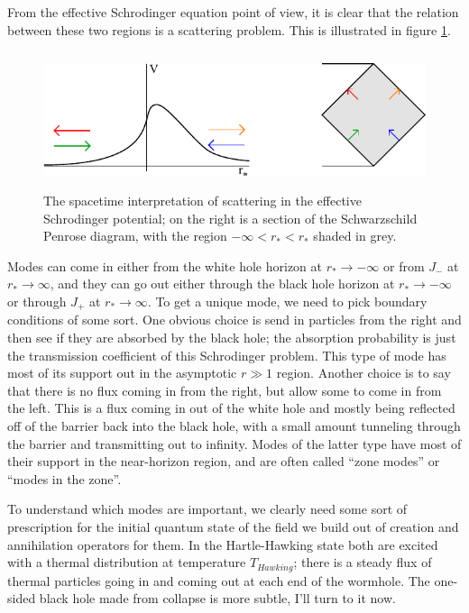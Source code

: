\documentclass[12pt]{article}
\begin{document}
From the effective Schrodinger equation point of view, it is clear that the relation between these two regions is a scattering problem. This is illustrated in figure \ref{schscat}.
\begin{figure}
\begin{center}
\includegraphics[height=4cm]{schscat.pdf}
\caption{The spacetime interpretation of scattering in the effective Schrodinger potential; on the right is a section of the Schwarzschild Penrose diagram, with the region $-\infty<r_*<r_*$ shaded in grey.}\label{schscat}
\end{center}
\end{figure}
Modes can come in either from the white hole horizon at $r_*\to -\infty$ or from $J_-$ at $r_*\to \infty$, and they can go out either through the black hole horizon at $r_*\to -\infty$ or through $J_+$ at $r_* \to \infty$.  To get a unique mode, we need to pick boundary conditions of some sort.  One obvious choice is send in particles from the right and then see if they are absorbed by the black hole; the absorption probability is just the transmission coefficient of this Schrodinger problem.  This type of mode has most of its support out in the asymptotic $r\gg 1$ region.  Another choice is to say that there is no flux coming in from the right, but allow some to come in from the left. This is a flux coming in out of the white hole and mostly being reflected off of the barrier back into the black hole, with a small amount tunneling through the barrier and transmitting out to infinity.  Modes of the latter type have most of their support in the near-horizon region, and are often called ``zone modes'' or ``modes in the zone''.  

To understand which modes are important, we clearly need some sort of prescription for the initial quantum state of the field we build out of creation and annihilation operators for them.  In the Hartle-Hawking state both are excited with a thermal distribution at temperature $T_{\mathit{Hawking}}$; there is a steady flux of thermal particles going in and coming out at each end of the wormhole.  The one-sided black hole made from collapse is more subtle, I'll turn to it now.
\end{document}
